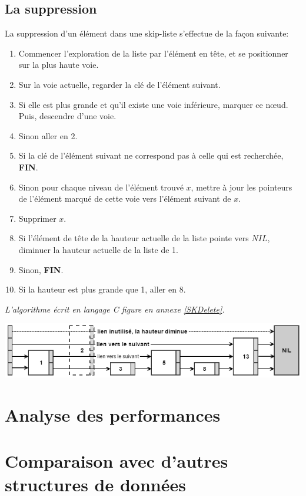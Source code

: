 \documentclass[hidelinks,a4paper, 12pt]{article}
\begin{document}
	\subsection{La suppression}
	La suppression d'un élément dans une skip-liste s'effectue de la façon suivante:
	\begin{enumerate}
		\item Commencer l'exploration de la liste par l'élément en tête, et se positionner sur la plus haute voie.
		\item Sur la voie actuelle, regarder la clé de l'élément suivant.
		\item Si elle est plus grande et qu'il existe une voie inférieure, marquer ce nœud. Puis, descendre d'une voie.
		\item Sinon aller en 2.
		\item Si la clé de l'élément suivant ne correspond pas à celle qui est recherchée, \textbf{FIN}.
		\item Sinon pour chaque niveau de l'élément trouvé $x$, mettre à jour les pointeurs de l'élément marqué de cette voie vers l'élément suivant de $x$.
		\item Supprimer $x$.
		\item Si l'élément de tête de la hauteur actuelle de la liste pointe vers $NIL$, diminuer la hauteur actuelle de la liste de 1.
		\item Sinon, \textbf{FIN}.
		\item Si la hauteur est plus grande que 1, aller en 8.
	\end{enumerate}
	\emph{L'algorithme écrit en langage C figure en annexe \ref{SKDelete}.}
	\begin{center}
		\includegraphics[width=\textwidth]{img/delete}
	\end{center}
	
	\section{Analyse des performances}\label{perf}
	\section{Comparaison avec d'autres structures de données}
	
\end{document}
